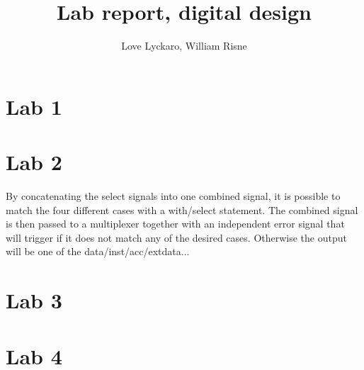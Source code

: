 \documentclass[a4paper]{article}
\title{Lab report, digital design}
\author{Love Lyckaro, William Risne}
\begin{document}
\maketitle

    \section*{Lab 1}

    \section*{Lab 2}
        By concatenating the select signals into one combined signal, it is
        possible to match the four different cases with a with/select statement.
        The combined signal is then passed to a multiplexer together with an
        independent error signal that will trigger if it does not match any of the
        desired cases. Otherwise the output will be one of the
        data/inst/acc/extdata...
    \section*{Lab 3}

    \section*{Lab 4}
\end{document}
